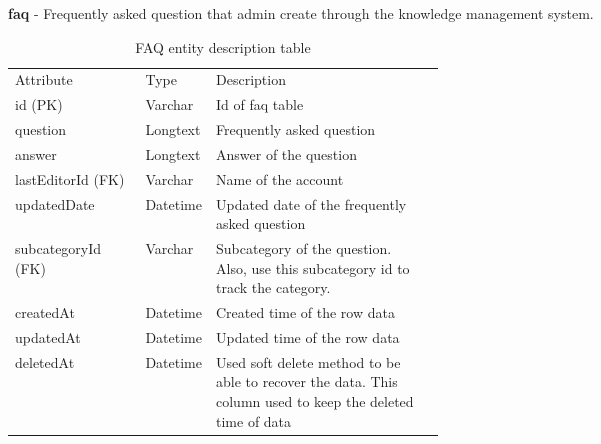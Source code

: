 \documentclass[12pt,oneside,openright,a4paper]{cpe-english-project}
\begin{document}
\pagebreak
\textbf{faq} - Frequently asked question that admin create through the knowledge management system.
\begin{table}[ht]
	\caption{FAQ entity description table}
	\label{tab:FAQ entity description table}
\begin{adjustbox}{width=\textwidth}
\begin{tabular}{llp{0.5\linewidth}l}
\rowcolor[HTML]{5B9BD5} 
Attribute          & Type     & Description                                                                                                   \\
\rowcolor[HTML]{DEEAF6} 
id (PK)            & Varchar  & Id of faq table                                                                                               \\
question           & Longtext  & Frequently asked   question                                                                                   \\
\rowcolor[HTML]{DEEAF6} 
answer             & Longtext  & Answer of the question                                                                                        \\
lastEditorId (FK)  & Varchar  & Name of the account                                                                                        \\
\rowcolor[HTML]{DEEAF6} 
updatedDate		   & Datetime & Updated date of the frequently asked question 																\\
subcategoryId (FK) & Varchar  & Subcategory of the question. Also, use this subcategory id to track   the category.                           \\
\rowcolor[HTML]{DEEAF6} 
createdAt          & Datetime & Created time of the row   data                                                                                \\
updatedAt          & Datetime & Updated time of the row data                                                                                  \\
\rowcolor[HTML]{DEEAF6} 
deletedAt          & Datetime & Used soft delete method   to be able to recover the data. This column used to keep the deleted time of data
\end{tabular}
\end{adjustbox}
\end{table}
\end{document}
